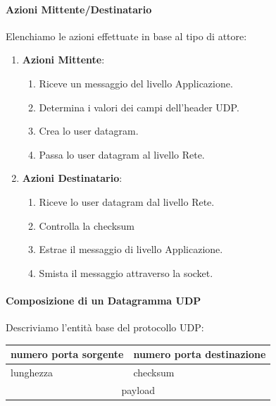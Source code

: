 \documentclass{article}
\begin{document}
\paragraph{Azioni Mittente/Destinatario} Elenchiamo le azioni effettuate in base al tipo di attore:

\begin{enumerate}
    \item \textbf{Azioni Mittente}:
    \begin{enumerate}
        \item Riceve un messaggio del livello Applicazione.
        \item Determina i valori dei campi dell'header UDP.
        \item Crea lo user datagram.
        \item Passa lo user datagram al livello Rete.
    \end{enumerate}
    \item \textbf{Azioni Destinatario}:
    \begin{enumerate}
        \item Riceve lo user datagram dal livello Rete.
        \item Controlla la checksum
        \item Estrae il messaggio di livello Applicazione.
        \item Smista il messaggio attraverso la socket.
    \end{enumerate}
\end{enumerate}

\paragraph{Composizione di un Datagramma UDP} Descriviamo l'entità base del protocollo UDP:

\vspace*{10px}

\begin{center}
    \begin{tabular}{|l|l|}
    \hline
    numero porta sorgente & numero porta destinazione \\
    \hline
    lunghezza & checksum \\
    \hline
    \multicolumn{2}{|c|}{\rule{0pt}{3em}payload\rule{0pt}{3em}} \\
    \hline
    \end{tabular}
\end{center}

\vspace*{10px}
\end{document}
